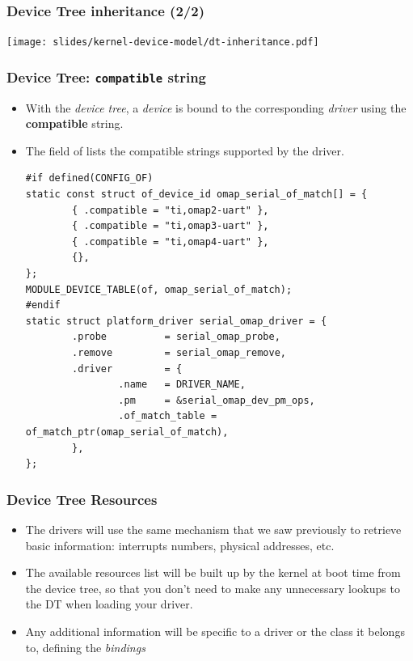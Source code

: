 \begin{frame}
  \frametitle{Device Tree inheritance (2/2)}
  \begin{center}
    \texttt{[image: slides/kernel-device-model/dt-inheritance.pdf]}
  \end{center}
\end{frame}

\begin{frame}[fragile]
  \frametitle{Device Tree: {\tt compatible} string}
  \begin{itemize}
  \item With the {\em device tree}, a {\em device} is bound to the
    corresponding {\em driver} using the {\bf compatible} string.
  \item The  field of 
    lists the compatible strings supported by the driver.
    \begin{block}{}
  \begin{verbatim}
#if defined(CONFIG_OF)
static const struct of_device_id omap_serial_of_match[] = {
        { .compatible = "ti,omap2-uart" },
        { .compatible = "ti,omap3-uart" },
        { .compatible = "ti,omap4-uart" },
        {},
};
MODULE_DEVICE_TABLE(of, omap_serial_of_match);
#endif
static struct platform_driver serial_omap_driver = {
        .probe          = serial_omap_probe,
        .remove         = serial_omap_remove,
        .driver         = {
                .name   = DRIVER_NAME,
                .pm     = &serial_omap_dev_pm_ops,
                .of_match_table = of_match_ptr(omap_serial_of_match),
        },
};
\end{verbatim}
\end{block}
  \end{itemize}
\end{frame}

\begin{frame}
  \frametitle{Device Tree Resources}
  \begin{itemize}
  \item The drivers will use the same mechanism that we saw previously
    to retrieve basic information: interrupts numbers, physical
    addresses, etc.
  \item The available resources list will be built up by the kernel at
    boot time from the device tree, so that you don't need to make any
    unnecessary lookups to the DT when loading your driver.
  \item Any additional information will be specific to a driver or
    the class it belongs to, defining the {\em bindings}
  \end{itemize}
\end{frame}

